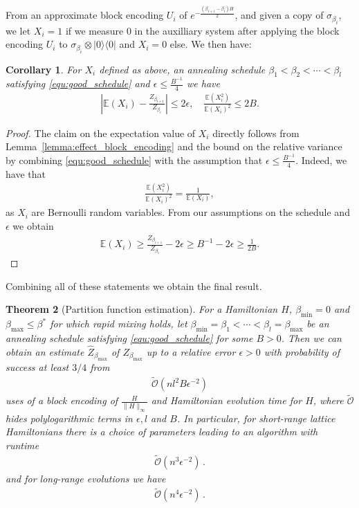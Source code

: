 \documentclass[aps,pra,amsmath,amssymb,twocolumn,10pt]{revtex4-2}
\newtheorem{thm}{Theorem}
\newtheorem{cor}[thm]{Corollary}
\theoremstyle{definition}
\newcommand{\ketbra}[2]{|#1\rangle\langle #2|}
\begin{document}
From an approximate block encoding $U_i$ of $e^{-\tfrac{(\beta_{i+1}-\beta_{i})H}{2}}$, and given a copy of $\sigma_{\beta_i}$, we let $X_i=1$ if we measure $0$ in the auxilliary system after applying the block encoding $U_i$ to $\sigma_{\beta_i}\otimes\ketbra{0}{0}$ and $X_i=0$ else.
We then have:
\begin{cor}
	For $X_i$ defined as above, an annealing schedule $\beta_1<\beta_2<\cdots<\beta_l$ satisfying \eqref{equ:good_schedule} and $\epsilon\leq \frac{B^{-1}}{4}$  we have
	\begin{align}
		\left|\mathbb{E}(X_i)-\frac{Z_{\beta_{i+1}}}{Z_{\beta_{i}}}\right|\leq 2\epsilon,\quad \frac{\mathbb{E}\left(X_{i}^{2}\right)}{\mathbb{E}\left(X_{i}\right)^{2}}\leq 2B.
	\end{align}
\end{cor}
\begin{proof}
	The claim on the expectation value of $X_i$ directly follows from Lemma~\ref{lemma:effect_block_encoding} and the bound on the relative variance by combining \eqref{equ:good_schedule} with the assumption that $\epsilon\leq \frac{B^{-1}}{4}$. Indeed, we have that 
	\begin{align}
		\frac{\mathbb{E}\left(X_{i}^{2}\right)}{\mathbb{E}\left(X_{i}\right)^{2}}=\frac{1}{\mathbb{E}\left(X_{i}\right)},
	\end{align}
	as $X_i$ are Bernoulli random variables. From our assumptions on the schedule and $\epsilon$ we obtain
	\begin{align}
		\mathbb{E}\left(X_{i}\right)\geq \frac{Z_{\beta_{i+1}}}{Z_{\beta_{i}}}-2\epsilon\geq B^{-1}-2\epsilon\geq \frac{1}{2B}.
	\end{align}
\end{proof}
Combining all of these statements we obtain the final result.
\begin{thm}[Partition function estimation]%
	For a Hamiltonian $H$, $\beta_{\min}=0$ and $\beta_{\max}\leq\beta^*$ for which rapid mixing holds, let $\beta_{\min}=\beta_1<\cdots<\beta_l=\beta_{\max}$ be an annealing schedule satisfying \eqref{equ:good_schedule} for some $B>0$. Then we can obtain an estimate $\hat{Z}_{\beta_{\max}}$ of $Z_{\beta_{\max}}$ up to a relative error $\epsilon>0$ with probability of success at least $3/4$ from 
	\begin{align}
		\widetilde{\mathcal{O}}(n l^2B\epsilon^{-2})
	\end{align}
	uses of a block encoding of $\tfrac{H}{\|H\|_\infty}$ and Hamiltonian evolution time for $H$, where $\widetilde{\mathcal{O}}$ hides polylogarithmic terms in $\epsilon, l$ and $B$. In particular, for short-range lattice Hamiltonians there is a choice of parameters leading to an algorithm with runtime
	\begin{align}
		\widetilde{\mathcal{O}}(n^3\epsilon^{-2})\,.
	\end{align}
	and for long-range evolutions we have
	\begin{align}
		\widetilde{\mathcal{O}}(n^4\epsilon^{-2})\,.
	\end{align}
\end{thm}
\end{document}
